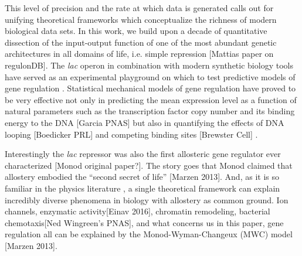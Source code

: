 This level of precision and the rate at which data is generated calls out for
unifying theoretical frameworks which conceptualize the richness of modern
biological data sets. In this work, we build upon a decade of quantitative
dissection of the input-output function of one of the most abundant genetic
architectures in all domains of life, i.e. simple repression [Mattias paper on
regulonDB]. The \textit{lac} operon in combination with modern synthetic biology
tools have served as an experimental playground on which to test predictive
models of gene regulation . Statistical mechanical models of gene regulation have
proved to be very effective not only in predicting the mean expression level as a
function of natural parameters such as the transcription factor copy number and
its binding energy to the DNA [Garcia PNAS] but also in quantifying the effects of DNA looping
[Boedicker PRL] and competing binding sites [Brewster Cell] .

Interestingly the \textit{lac} repressor was also the first allosteric gene
regulator ever characterized [Monod original paper?]. The story goes that Monod
claimed  that allostery embodied the ``second secret of life'' [Marzen 2013].
And, as it is so familiar in the physics literature , a single theoretical
framework can explain incredibly diverse phenomena in biology with allostery as
common ground. Ion channels, enzymatic activity[Einav 2016], chromatin
remodeling, bacterial chemotaxis[Ned Wingreen's PNAS], and what concerns us in
this paper, gene regulation all can be explained by the Monod-Wyman-Changeux
(MWC) model [Marzen 2013]. 

